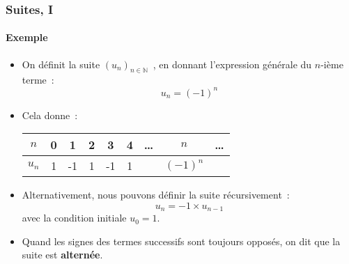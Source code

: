 \documentclass[10pt,notheorems]{beamer}
\theoremstyle{plain}
\theoremstyle{definition} %
\begin{document}
\begin{frame}
  \frametitle{Suites, I}
  \framesubtitle{Exemple}
  \hypertarget{slide_suites_2}{}

  \begin{itemize}

  \item On définit la suite $(u_n)_{n\in\mathbb N}$~, en donnant l'expression générale du $n$-ième terme~:
    \[
      u_n = (-1)^n
    \]

  \item Cela donne~:\newline
    \begin{center}
      \begin{table}[H]
        \centering
        \begin{tabular}{c|cccccccc}
          $n$ & 0 & 1 & 2 & 3 & 4 & \ldots & $n$ & \ldots\\\hline
          $u_n$ & 1 & -1 & 1 & -1 & 1 &     & $(-1)^n$ &
        \end{tabular}
      \end{table}
    \end{center}

    \bigskip

  \item Alternativement, nous pouvons définir la suite récursivement~:
    \[
      u_n = -1\times u_{n-1}
    \]
    avec la condition initiale $u_0 = 1$.\newline

  \item Quand les signes des termes successifs sont toujours opposés, on dit que la suite est \textbf{alternée}.
  \end{itemize}

\end{frame}
\end{document}
